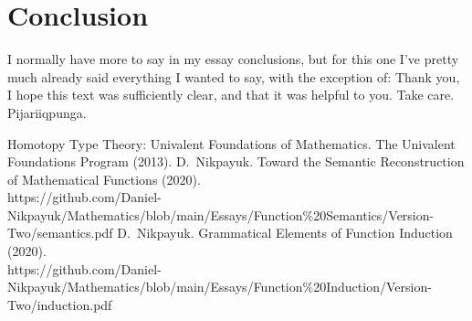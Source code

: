 \documentclass[twoside]{article}
\begin{document}
\section*{Conclusion}

I normally have more to say in my essay conclusions, but for this one I've pretty much already said everything I wanted to say,
with the exception of: Thank you, I hope this text was sufficiently clear, and that it was helpful to you. Take care.
\ \\

Pijariiqpunga.

\vfill

\begin{thebibliography}{99}
 Homotopy Type Theory: Univalent Foundations of Mathematics. The Univalent Foundations Program (2013). 
 D.~Nikpayuk. Toward the Semantic Reconstruction of Mathematical Functions (2020).\\
    https://github.com/Daniel-Nikpayuk/Mathematics/blob/main/Essays/Function\%20Semantics/Version-Two/semantics.pdf
 D.~Nikpayuk. Grammatical Elements of Function Induction (2020).\\
    https://github.com/Daniel-Nikpayuk/Mathematics/blob/main/Essays/Function\%20Induction/Version-Two/induction.pdf
\end{thebibliography}
\end{document}
